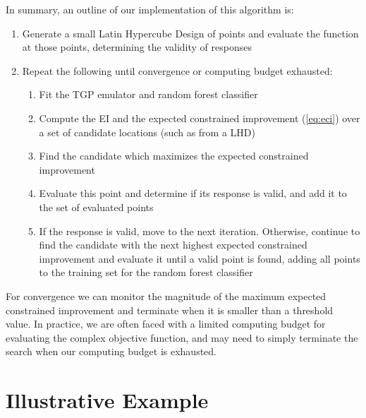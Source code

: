 \documentclass[12pt]{article}
\begin{document}
In summary, an outline of our implementation of this algorithm is:
\begin{enumerate}
\item Generate a small Latin Hypercube Design of points and evaluate
  the function at those points, determining the validity of responses
\item Repeat the following until convergence or computing budget exhausted:
 \begin{enumerate}
 \item Fit the TGP emulator and random forest classifier
 \item Compute the EI and the expected constrained improvement
  (\ref{eq:eci}) over a set of candidate locations (such as from a LHD)
 \item Find the candidate which maximizes the expected constrained improvement
 \item Evaluate this point and determine if its response is valid, and
  add it to the set of evaluated points
 \item If the response is valid, move to the next iteration.
 Otherwise, continue to find the candidate with the next highest expected
 constrained improvement and evaluate it until a valid point is found,
 adding all points to the training set for the random forest classifier
 \end{enumerate}
\end{enumerate}
For convergence we can monitor the magnitude of the maximum expected
constrained improvement and terminate when it is smaller than a
threshold value.  In practice, we are often faced with a limited
computing budget for evaluating the complex objective function, and
may need to simply terminate the search when our computing budget is
exhausted. 

\section{Illustrative Example} \label{sec:ex}
\end{document}
